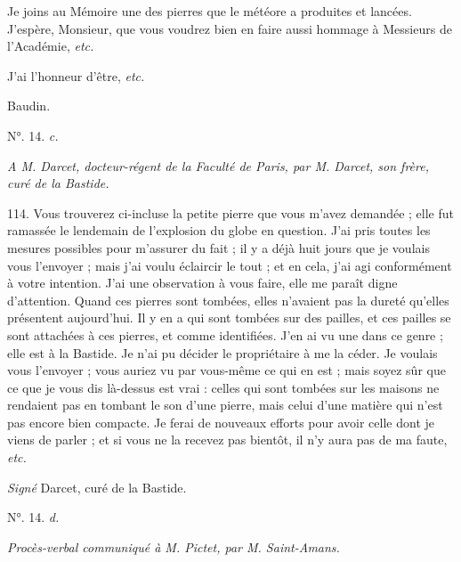 \documentclass[a4paper, 11pt, oneside, polutonikogreek, french]{article}
\begin{document}
\og Je joins au Mémoire une des pierres que le météore a produites et lancées. J'espère, Monsieur, que vous voudrez bien en faire aussi hommage à Messieurs de l'Académie, \emph{etc.} \fg

J'ai l'honneur d'être, \emph{etc.}

Baudin.

\begin{center}
N°. 14. \emph{c.}
\end{center}

\emph{A M. Darcet, docteur-régent de la Faculté de Paris, par M. Darcet, son frère, curé de la Bastide.}

114. \og Vous trouverez ci-incluse la petite pierre que vous m'avez demandée ; elle fut ramassée le lendemain de l'explosion du globe en question. J'ai pris toutes les mesures possibles pour m'assurer du fait ; il y a déjà huit jours que je voulais vous l'envoyer ; mais j'ai voulu éclaircir le tout ; et en cela, j'ai agi conformément à votre intention. J'ai une observation à vous faire, elle me paraît digne d'attention. Quand ces pierres sont tombées, elles n'avaient pas la dureté qu'elles présentent aujourd'hui. Il y en a qui sont tombées sur des pailles, et ces pailles se sont attachées à ces pierres, et comme identifiées. J'en ai vu une dans ce genre ; elle est à la Bastide. Je n'ai pu décider le propriétaire à me la céder. Je voulais vous l'envoyer ; vous auriez vu par vous-même ce qui en est ; mais soyez sûr que ce que je vous dis là-dessus est vrai : celles qui sont tombées sur les maisons ne rendaient pas en tombant le son d'une pierre, mais celui d'une matière qui n'est pas encore bien compacte. Je ferai de nouveaux efforts pour avoir celle dont je viens de parler ; et si vous ne la recevez pas bientôt, il n'y aura pas de ma faute, \emph{etc.} \fg

\emph{Signé} Darcet, curé de la Bastide.

\begin{center}
N°. 14. \emph{d.}
\end{center}

\emph{Procès-verbal communiqué à M. Pictet, par M. Saint-Amans.}
\end{document}
